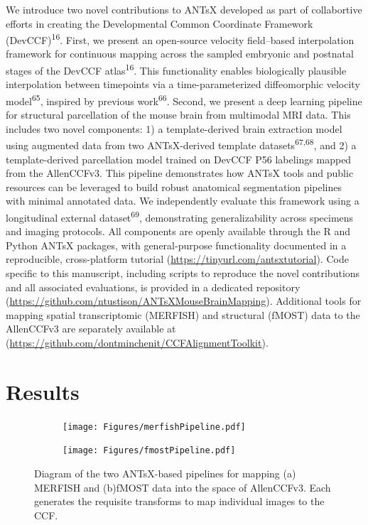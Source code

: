 \documentclass[
  12pt,
]{article}
\begin{document}
We introduce two novel contributions to ANTsX developed as part of
collabortive efforts in creating the Developmental Common Coordinate
Framework (DevCCF)\textsuperscript{16}. First, we present an open-source
velocity field--based interpolation framework for continuous mapping
across the sampled embryonic and postnatal stages of the DevCCF
atlas\textsuperscript{16}. This functionality enables biologically
plausible interpolation between timepoints via a time-parameterized
diffeomorphic velocity model\textsuperscript{65}, inspired by previous
work\textsuperscript{66}. Second, we present a deep learning pipeline
for structural parcellation of the mouse brain from multimodal MRI data.
This includes two novel components: 1) a template-derived brain
extraction model using augmented data from two ANTsX-derived template
datasets\textsuperscript{67,68}, and 2) a template-derived parcellation
model trained on DevCCF P56 labelings mapped from the AllenCCFv3. This
pipeline demonstrates how ANTsX tools and public resources can be
leveraged to build robust anatomical segmentation pipelines with minimal
annotated data. We independently evaluate this framework using a
longitudinal external dataset\textsuperscript{69}, demonstrating
generalizability across specimens and imaging protocols. All components
are openly available through the R and Python ANTsX packages, with
general-purpose functionality documented in a reproducible,
cross-platform tutorial (\url{https://tinyurl.com/antsxtutorial}). Code
specific to this manuscript, including scripts to reproduce the novel
contributions and all associated evaluations, is provided in a dedicated
repository (\url{https://github.com/ntustison/ANTsXMouseBrainMapping}).
Additional tools for mapping spatial transcriptomic (MERFISH) and
structural (fMOST) data to the AllenCCFv3 are separately available at
(\url{https://github.com/dontminchenit/CCFAlignmentToolkit}).

\clearpage
\newpage

\section{Results}\label{results}

\begin{figure}
\centering
\begin{subfigure}[t]{0.49\textwidth}
\centering
\texttt{[image: Figures/merfishPipeline.pdf]}
\caption{}
\end{subfigure} 
\begin{subfigure}[t]{0.49\textwidth}
\centering
\texttt{[image: Figures/fmostPipeline.pdf]}
\caption{}
\end{subfigure}
\caption{Diagram of the two ANTsX-based pipelines for mapping (a) MERFISH
          and (b)fMOST data into the space of AllenCCFv3.  Each generates
         the requisite transforms to map individual images
         to the CCF.}
\label{fig:allenpipelines}
\end{figure}
\end{document}
